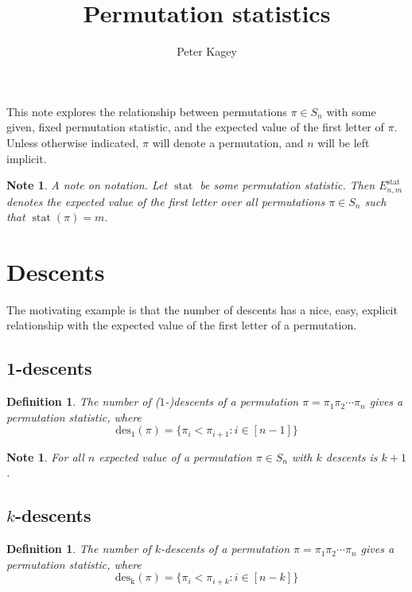 \documentclass{article}
\newtheorem{definition}[theo]{Definition}
\newtheorem{note}[theo]{Note}
\begin{document}
\title{Permutation statistics}
\author{Peter Kagey}

\maketitle
This note explores the relationship between permutations $\pi \in S_n$ with some
given, fixed permutation statistic, and the expected value of the first letter
of $\pi$. Unless otherwise indicated, $\pi$ will denote a permutation, and $n$
will be left implicit.

\begin{note}
  A note on notation. Let $\operatorname{stat}$ be some permutation statistic. Then
  $E_{n,m}^\text{stat}$ denotes the expected value of the first letter over 
  all permutations $\pi \in S_n$ such that $\operatorname{stat}(\pi) = m$.
\end{note}

\section{Descents}
The motivating example is that the number of descents has a nice, easy, explicit
relationship with the expected value of the first letter of a permutation.
\subsection{1-descents}
\begin{definition}
  The number of ($1$-)descents of a permutation
  $\pi = \pi_1\pi_2\cdots\pi_n$ gives a permutation statistic, where \[
    \operatorname{des_1}(\pi) = \{\pi_i < \pi_{i+1} : i \in [n-1]\}
  \]
\end{definition}
\begin{note}
  For all $n$ expected value of a permutation $\pi \in S_n$ with $k$ descents is $k+1$.
\end{note}
\subsection{$k$-descents}
\begin{definition}
  The number of $k$-descents of a permutation $\pi = \pi_1\pi_2\cdots\pi_n$
  gives a permutation statistic, where \[
    \operatorname{des_k}(\pi) = \{\pi_i < \pi_{i+k} : i \in [n-k]\}
  \]
\end{definition}
\end{document}
